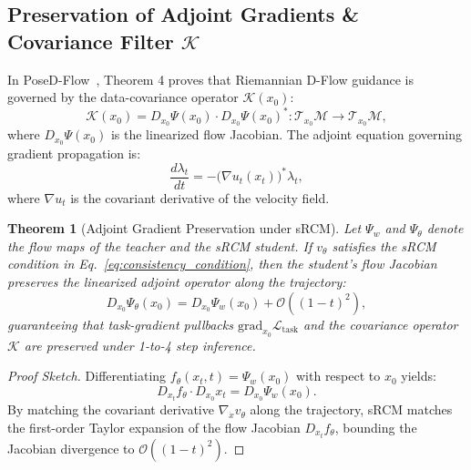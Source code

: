 \documentclass[10pt,twocolumn,letterpaper]{article}
\newtheorem{theorem}{Theorem}
\begin{document}
\subsection{Preservation of Adjoint Gradients \& Covariance Filter $\mathcal{K}$}
In PoseD-Flow~\cite{nadar2026posedflow}, Theorem 4 proves that Riemannian D-Flow guidance is governed by the data-covariance operator $\mathcal{K}(x_0)$:
\begin{equation}
\mathcal{K}(x_0) = D_{x_0}\Psi(x_0) \cdot D_{x_0}\Psi(x_0)^* : \mathcal{T}_{x_0}\mathcal{M} \to \mathcal{T}_{x_0}\mathcal{M},
\end{equation}
where $D_{x_0}\Psi(x_0)$ is the linearized flow Jacobian. The adjoint equation governing gradient propagation is:
\begin{equation}
\frac{d \lambda_t}{dt} = - \big( \nabla u_t(x_t) \big)^* \lambda_t,
\end{equation}
where $\nabla u_t$ is the covariant derivative of the velocity field.

\begin{theorem}[Adjoint Gradient Preservation under sRCM]
Let $\Psi_w$ and $\Psi_\theta$ denote the flow maps of the teacher and the sRCM student. If $v_\theta$ satisfies the sRCM condition in Eq.~\eqref{eq:consistency_condition}, then the student's flow Jacobian preserves the linearized adjoint operator along the trajectory:
\begin{equation}
D_{x_0}\Psi_\theta(x_0) = D_{x_0}\Psi_w(x_0) + \mathcal{O}((1-t)^2),
\end{equation}
guaranteeing that task-gradient pullbacks $\mathrm{grad}_{x_0}\mathcal{L}_{\mathrm{task}}$ and the covariance operator $\mathcal{K}$ are preserved under 1-to-4 step inference.
\end{theorem}
\begin{proof}[Proof Sketch]
Differentiating $f_\theta(x_t, t) = \Psi_w(x_0)$ with respect to $x_0$ yields:
\begin{equation}
D_{x_t} f_\theta \cdot D_{x_0} x_t = D_{x_0} \Psi_w(x_0).
\end{equation}
By matching the covariant derivative $\nabla_{\dot{x}} v_\theta$ along the trajectory, sRCM matches the first-order Taylor expansion of the flow Jacobian $D_{x_t} f_\theta$, bounding the Jacobian divergence to $\mathcal{O}((1-t)^2)$.
\end{proof}
\end{document}
